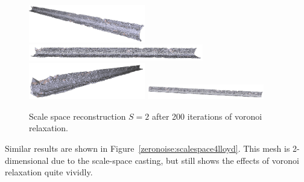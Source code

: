 \documentclass[12pt]{drexelthesis}
\begin{document}
\begin{figure}[!ht]
	
	\centering
		\includegraphics[width=2in]{simulated-lab-scan/0noise/optimized/scalespace2lloyd00.png}
		\includegraphics[width=3in]{simulated-lab-scan/0noise/optimized/scalespace2lloyd01.png}
		\includegraphics[width=2in]{simulated-lab-scan/0noise/optimized/scalespace2lloyd02.png}
		\includegraphics[width=2in]{simulated-lab-scan/0noise/optimized/scalespace2lloyd03.png}
		\caption[Scale space reconstruction $S = 2$ after 200 iterations of voronoi relaxation]{\centering Scale space reconstruction $S = 2$ after 200 iterations of voronoi relaxation.}
	\label{zeronoise:scalespace2lloyd}
\end{figure}

Similar results are shown in Figure~\ref{zeronoise:scalespace4lloyd}. This mesh is 2-dimensional due to the scale-space casting, but still shows the effects of voronoi relaxation quite vividly.
\end{document}
